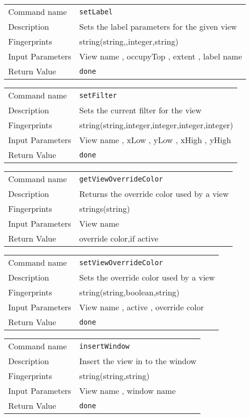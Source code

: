 \noindent
\begin{tabular}{l|p{5in}}
\hline
Command name &{\tt setLabel }\\ 
Description &
 Sets the label parameters for the given view 
 	\\
Fingerprints & string(string,,integer,string)\\
Input Parameters& View name , occupyTop , extent , label name \\
Return Value&{\tt done}\\
\hline
\end{tabular}
\bigskip

\noindent
\begin{tabular}{l|p{5in}}
\hline
Command name &{\tt setFilter }\\ 
Description &
 Sets the current filter for the view 
 	\\
Fingerprints & string(string,integer,integer,integer,integer)\\
Input Parameters& View name , xLow , yLow , xHigh , yHigh \\
Return Value&{\tt done}\\
\hline
\end{tabular}
\bigskip

\noindent
\begin{tabular}{l|p{5in}}
\hline
Command name &{\tt getViewOverrideColor }\\ 
Description &
 Returns the override color used by a view 
 	\\
Fingerprints & strings(string)\\
Input Parameters& View name \\
Return Value& override color,if active\\
\hline
\end{tabular}
\bigskip

\noindent
\begin{tabular}{l|p{5in}}
\hline
Command name &{\tt setViewOverrideColor }\\ 
Description &
 Sets the override color used by a view 
 	\\
Fingerprints & string(string,boolean,string)\\
Input Parameters& View name , active , override color \\
Return Value&{\tt done}\\
\hline
\end{tabular}
\bigskip

\noindent
\begin{tabular}{l|p{5in}}
\hline
Command name &{\tt insertWindow }\\ 
Description &
 Insert the view in to the window 
 	\\
Fingerprints & string(string,string)\\
Input Parameters& View name , window name \\
Return Value&{\tt done}\\
\hline
\end{tabular}
\bigskip

